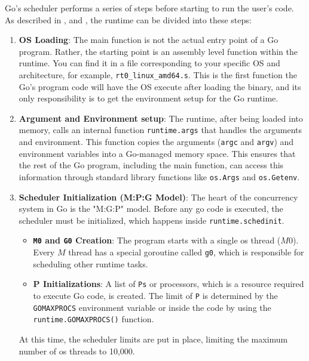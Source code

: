Go's scheduler performs a series of steps before starting to run the user's code. As described in \cite{go:GoLabConf-runtime}, \cite{go:ardanlabs-runtime} and \cite{go:memory-allocation}, the runtime can be divided into these steps:
\begin{enumerate}
    \item \textbf{OS Loading}:
    The main function is not the actual entry point of a Go program. Rather, the starting point is an assembly level function within the runtime. You can find it in a file corresponding to your specific OS and architecture, for example, \texttt{rt0\_linux\_amd64.s}. This is the first function the Go's program code will have the OS execute after loading the binary, and its only responsibility is to get the environment setup for the Go runtime.
        
    \item \textbf{Argument and Environment setup}:
        The runtime, after being loaded into memory, calls an internal function \texttt{runtime.args} that handles the arguments and environment. This function copies the arguments (\texttt{argc} and \texttt{argv}) and environment variables into a Go-managed memory space. This ensures that the rest of the Go program, including the main function, can access this information through standard library functions like \texttt{os.Args} and \texttt{os.Getenv}.
    \item \textbf{Scheduler Initialization (M:P:G Model)}:
        The heart of the concurrency system in Go is the "M:G:P" model. Before any go code is executed, the scheduler must be initialized, which happens inside \texttt{runtime.schedinit}.
        \begin{itemize}
            \item \textbf{\texttt{M0} and \texttt{G0} Creation}: The program starts with a single \gls{os} thread ($M0$). Every $M$ thread has a special \gls{goroutine} called \texttt{g0}, which is responsible for scheduling other runtime tasks.
            \item \textbf{P Initializations}: A list of \texttt{Ps} or processors, which is a resource required to execute Go code, is created. The limit of \texttt{P} is determined by the \texttt{GOMAXPROCS} environment variable or inside the  code by using the \texttt{runtime.GOMAXPROCS()} function.
        \end{itemize}
        At this time, the scheduler limits are put in place, limiting the maximum number of \gls{os} threads to 10,000.
        

\end{enumerate}
